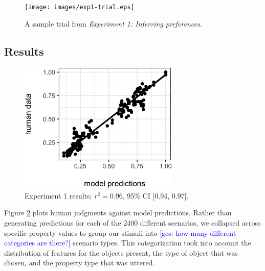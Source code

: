 \documentclass[10pt,a4paper]{article}
\newcommand{\gcs}[1]{\textcolor{blue}{[gcs: #1]}}
\begin{document}
\begin{figure}[ht!]
	\centering
	\texttt{[image: images/exp1-trial.eps]}
	\caption{A sample trial from \emph{Experiment 1: Inferring preferences}.}\label{exp1-trial}
\end{figure}

\subsection{Results}

\begin{figure}[ht]
	\centering
	\includegraphics[width=3in]{images/X4-scatter-CogSci.eps}
	\caption{Experiment 1 results; $r^{2}=0.96$, 95\% CI [0.94, 0.97].}\label{exp1-results}
\end{figure}

Figure \ref{exp1-results} plots human judgments against model predictions. Rather than generating predictions for each of the 2400 different scenarios, we collapsed across specific property values to group our stimuli into \gcs{how many different categories are there?} scenario types. This categorization took into account the distribution of features for the objects present, the type of object that was chosen, and the property type that was uttered.
\end{document}
